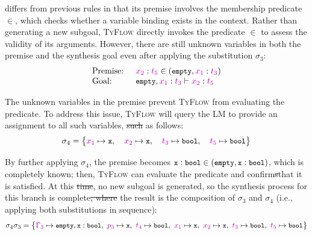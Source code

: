 \documentclass[manuscript,screen]{acmart}
\makeatletter
\newcommand{\stlctype}[3]{{#1} \vdash {#2} : {#3}}
\newcommand{\sk}[1]{\textcolor{skunknown}{#1}}
\newcommand{\toolname}[1]{\textsc{#1}}
\newcommand{\tcode}[1]{{\small \texttt{\spaceskip=0.2em #1}}}
\newcommand{\mainname}{\toolname{TyFlow}\xspace}
\providecommand{\DIFadd}[1]{{\protect\color{blue}\uwave{#1}}} %
\providecommand{\DIFdel}[1]{{\protect\color{red}\sout{#1}}} %
\providecommand{\DIFaddbegin}{} %
\providecommand{\DIFaddend}{} %
\providecommand{\DIFdelbegin}{} %
\providecommand{\DIFdelend}{} %
\providecommand{\DIFscaledelfig}{0.5}
\newlength{\DIFdelgraphicswidth} %
\newlength{\DIFdelgraphicsheight} %
\providecommand{\DIFaddincludegraphics}[2][]{{\color{blue}\fbox{\DIFOincludegraphics[#1]{#2}}}} %
\providecommand{\DIFdelincludegraphics}[2][]{%
\sbox{\DIFdelgraphicsbox}{\DIFOincludegraphics[#1]{#2}}%
\settoboxwidth{\DIFdelgraphicswidth}{\DIFdelgraphicsbox} %
\settoboxtotalheight{\DIFdelgraphicsheight}{\DIFdelgraphicsbox} %
\scalebox{\DIFscaledelfig}{%
\parbox[b]{\DIFdelgraphicswidth}{\usebox{\DIFdelgraphicsbox}\\[-\baselineskip] \rule{\DIFdelgraphicswidth}{0em}}\llap{\resizebox{\DIFdelgraphicswidth}{\DIFdelgraphicsheight}{%
\setlength{\unitlength}{\DIFdelgraphicswidth}%
\begin{picture}(1,1)%
\thicklines\linethickness{2pt} %
{\color[rgb]{1,0,0}\put(0,0){\framebox(1,1){}}}%
{\color[rgb]{1,0,0}\put(0,0){\line( 1,1){1}}}%
{\color[rgb]{1,0,0}\put(0,1){\line(1,-1){1}}}%
\end{picture}%
}\hspace*{3pt}}} %
} %
\DeclareRobustCommand{\DIFaddbegin}{\DIFOaddbegin \let\includegraphics\DIFaddincludegraphics} %
\DeclareRobustCommand{\DIFaddend}{\DIFOaddend \let\includegraphics\DIFOincludegraphics} %
\DeclareRobustCommand{\DIFdelbegin}{\DIFOdelbegin \let\includegraphics\DIFdelincludegraphics} %
\DeclareRobustCommand{\DIFdelend}{\DIFOaddend \let\includegraphics\DIFOincludegraphics} %
\let\sout@orig\sout %
\renewcommand{\sout}[1]{\ifmmode\text{\sout@orig{\ensuremath{#1}}}\else\sout@orig{#1}\fi} %
\makeatother
\begin{document}
 differs from previous rules in that its premise involves the membership predicate $\in$, which checks whether a variable binding exists in the context.
%
Rather than generating a new subgoal, \mainname directly invokes the predicate $\in$ to assess the validity of its arguments.
%
However, there are still unknown variables in both the premise and the synthesis goal even after applying the substitution $\sigma_3$:
$$\begin{array}{ll}
\textrm{Premise: } & \checkBinding{(\snoc{\tcode{empty}}{\sk{x_1}}{\sk{t_3}})}{\sk{x_2}}{\sk{t_5}}\\
\textrm{Goal: } & \stlctype{\snoc{\tcode{empty}}{\sk{x_1}}{\sk{t_3}}}{\sk{x_2}}{\sk{t_5}}
\end{array}$$

The unknown variables in the premise prevent \mainname from evaluating the predicate. 
%
To address this issue, \mainname will query the LM to provide an assignment to all such variables, \DIFdelbegin \DIFdel{such }\DIFdelend as follows:
\begin{gather}
\sigma_4 = \big\{ \sk{x_1} \mapsto \tcode{x},\quad \sk{x_2} \mapsto \tcode{x},\quad \sk{t_3} \mapsto \tcode{bool},\quad \sk{t_5} \mapsto \tcode{bool} \big\} \label{formula:sig4}
\end{gather}

By further applying $\sigma_4$, the premise becomes $\checkBinding{(\snoc{\tcode{empty}}{\tcode{x}}{\tcode{bool}})}{\tcode{x}}{\tcode{bool}}$, which is completely known; then, \mainname can evaluate the predicate and confirm\DIFdelbegin \DIFdel{s}\DIFdelend  that it is satisfied.
%
At this \DIFdelbegin \DIFdel{time}\DIFdelend \DIFaddbegin \DIFadd{point}\DIFaddend , no new subgoal is generated, so the synthesis process for this branch is complete\DIFdelbegin \DIFdel{, where }\DIFdelend \DIFaddbegin \DIFadd{; }\DIFaddend the result is the composition of $\sigma_3$ and $\sigma_4$ (i.e., applying both substitutions in sequence):
\[
\sigma_4 \sigma_3 = \big\{
\sk{\Gamma_3} \mapsto \snoc{\tcode{empty}}{\tcode{x}}{\tcode{bool}},\ 
\sk{p_3} \mapsto \tcode{x},\ 
\sk{t_4} \mapsto \tcode{bool},\ 
\sk{x_1} \mapsto \tcode{x},\ 
\sk{x_2} \mapsto \tcode{x},\ 
\sk{t_3} \mapsto \tcode{bool},\ 
\sk{t_5} \mapsto \tcode{bool}
\big\}
\]
\end{document}
